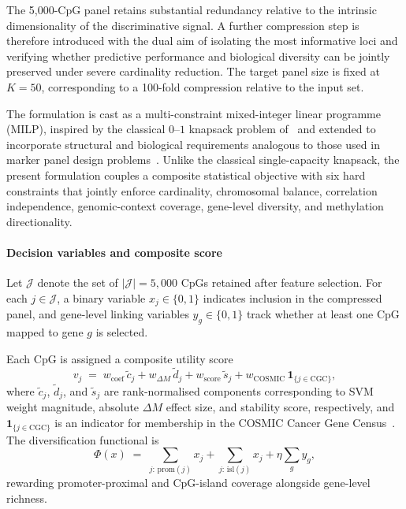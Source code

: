 The 5,000-CpG panel retains substantial redundancy relative to
the intrinsic dimensionality of the discriminative signal. A
further compression step is therefore introduced with the dual
aim of isolating the most informative loci and verifying
whether predictive performance and biological diversity can be
jointly preserved under severe cardinality reduction. The
target panel size is fixed at $K = 50$, corresponding to a
100-fold compression relative to the input set.

The formulation is cast as a multi-constraint mixed-integer
linear programme (MILP), inspired by the classical $0$--$1$
knapsack problem of~\cite{dantzig1957} and extended to
incorporate structural and biological requirements analogous
to those used in marker panel design
problems~\cite{wu2016snp,nishiyama2022ilp}. Unlike the
classical single-capacity knapsack, the present formulation
couples a composite statistical objective with six
hard constraints that jointly enforce cardinality,
chromosomal balance, correlation independence,
genomic-context coverage, gene-level diversity,
and methylation directionality.

\paragraph{Decision variables and composite score}

Let $\mathcal{J}$ denote the set of $|\mathcal{J}| = 5{,}000$
CpGs retained after feature selection. For each
$j \in \mathcal{J}$, a binary variable $x_j \in \{0,1\}$
indicates inclusion in the compressed panel, and gene-level
linking variables $y_g \in \{0,1\}$ track whether at least
one CpG mapped to gene $g$ is selected.

Each CpG is assigned a composite utility score
\begin{equation}
  v_j \;=\;
  w_{\mathrm{coef}}\,\tilde{c}_j
  + w_{\Delta M}\,\tilde{d}_j
  + w_{\mathrm{score}}\,\tilde{s}_j
  + w_{\mathrm{COSMIC}}\,\mathbf{1}_{\{j \in \mathrm{CGC}\}},
\end{equation}
where $\tilde{c}_j$, $\tilde{d}_j$, and $\tilde{s}_j$ are
rank-normalised components corresponding to SVM weight
magnitude, absolute $\Delta M$ effect size, and stability
score, respectively, and $\mathbf{1}_{\{j \in \mathrm{CGC}\}}$
is an indicator for membership in the COSMIC Cancer Gene
Census~\cite{sondka2018cosmic}. The diversification functional is
\begin{equation}
  \Phi(x) \;=\;
  \sum_{j:\,\mathrm{prom}(j)} x_j
  +\sum_{j:\,\mathrm{isl}(j)} x_j
  + \eta \sum_{g} y_g,
\end{equation}
rewarding promoter-proximal and CpG-island coverage
alongside gene-level richness.

